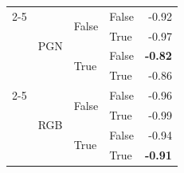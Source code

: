 \documentclass{article}
\begin{document}
\begin{table}
\begin{center}
{\begin{tabular}{@{}llllr@{}}
    \cmidrule{2-5}
                                                                        & \multirow[c]{4}{*}{PGN}   & \multirow[c]{2}{*}{False} & False                     & -0.92 \\
                                                                        &                           &                           & True                      & -0.97 \\
                                                                        &                           & \multirow[c]{2}{*}{True}  & False                     & \textbf{-0.82} \\
                                                                        &                           &                           & True                      & -0.86 \\
    \cmidrule{2-5}
                                                                        & \multirow[c]{4}{*}{RGB}   & \multirow[c]{2}{*}{False} & False                     & -0.96 \\
                                                                        &                           &                           & True                      & -0.99 \\
                                                                        &                           & \multirow[c]{2}{*}{True}  & False                     & -0.94 \\
                                                                        &                           &                           & True                      & \textbf{-0.91} \\
   \bottomrule
\end{tabular}
}
    \end{center}
    \label{tab:chess-ablation-anthropic}
\end{table}
\end{document}
